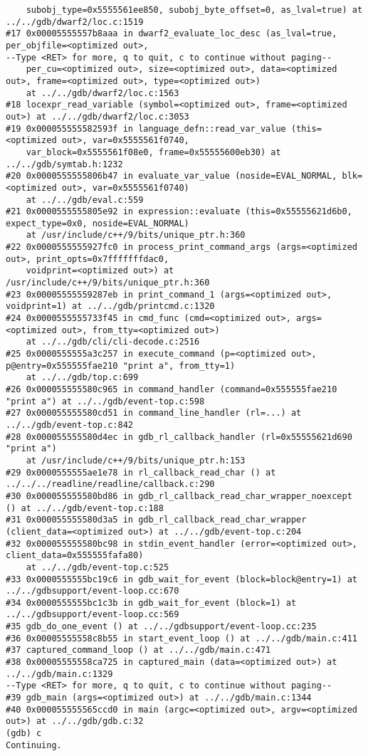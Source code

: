 \documentclass{report}
\begin{document}
\begin{verbatim}
    subobj_type=0x5555561ee850, subobj_byte_offset=0, as_lval=true) at ../../gdb/dwarf2/loc.c:1519
#17 0x00005555557b8aaa in dwarf2_evaluate_loc_desc (as_lval=true, per_objfile=<optimized out>, 
--Type <RET> for more, q to quit, c to continue without paging--
    per_cu=<optimized out>, size=<optimized out>, data=<optimized out>, frame=<optimized out>, type=<optimized out>)
    at ../../gdb/dwarf2/loc.c:1563
#18 locexpr_read_variable (symbol=<optimized out>, frame=<optimized out>) at ../../gdb/dwarf2/loc.c:3053
#19 0x000055555582593f in language_defn::read_var_value (this=<optimized out>, var=0x5555561f0740, 
    var_block=0x5555561f08e0, frame=0x55555600eb30) at ../../gdb/symtab.h:1232
#20 0x0000555555806b47 in evaluate_var_value (noside=EVAL_NORMAL, blk=<optimized out>, var=0x5555561f0740)
    at ../../gdb/eval.c:559
#21 0x0000555555805e92 in expression::evaluate (this=0x55555621d6b0, expect_type=0x0, noside=EVAL_NORMAL)
    at /usr/include/c++/9/bits/unique_ptr.h:360
#22 0x0000555555927fc0 in process_print_command_args (args=<optimized out>, print_opts=0x7fffffffdac0, 
    voidprint=<optimized out>) at /usr/include/c++/9/bits/unique_ptr.h:360
#23 0x00005555559287eb in print_command_1 (args=<optimized out>, voidprint=1) at ../../gdb/printcmd.c:1320
#24 0x0000555555733f45 in cmd_func (cmd=<optimized out>, args=<optimized out>, from_tty=<optimized out>)
    at ../../gdb/cli/cli-decode.c:2516
#25 0x0000555555a3c257 in execute_command (p=<optimized out>, p@entry=0x555555fae210 "print a", from_tty=1)
    at ../../gdb/top.c:699
#26 0x000055555580c965 in command_handler (command=0x555555fae210 "print a") at ../../gdb/event-top.c:598
#27 0x000055555580cd51 in command_line_handler (rl=...) at ../../gdb/event-top.c:842
#28 0x000055555580d4ec in gdb_rl_callback_handler (rl=0x55555621d690 "print a")
    at /usr/include/c++/9/bits/unique_ptr.h:153
#29 0x0000555555ae1e78 in rl_callback_read_char () at ../../../readline/readline/callback.c:290
#30 0x000055555580bd86 in gdb_rl_callback_read_char_wrapper_noexcept () at ../../gdb/event-top.c:188
#31 0x000055555580d3a5 in gdb_rl_callback_read_char_wrapper (client_data=<optimized out>) at ../../gdb/event-top.c:204
#32 0x000055555580bc98 in stdin_event_handler (error=<optimized out>, client_data=0x555555fafa80)
    at ../../gdb/event-top.c:525
#33 0x0000555555bc19c6 in gdb_wait_for_event (block=block@entry=1) at ../../gdbsupport/event-loop.cc:670
#34 0x0000555555bc1c3b in gdb_wait_for_event (block=1) at ../../gdbsupport/event-loop.cc:569
#35 gdb_do_one_event () at ../../gdbsupport/event-loop.cc:235
#36 0x00005555558c8b55 in start_event_loop () at ../../gdb/main.c:411
#37 captured_command_loop () at ../../gdb/main.c:471
#38 0x00005555558ca725 in captured_main (data=<optimized out>) at ../../gdb/main.c:1329
--Type <RET> for more, q to quit, c to continue without paging--
#39 gdb_main (args=<optimized out>) at ../../gdb/main.c:1344
#40 0x000055555565ccd0 in main (argc=<optimized out>, argv=<optimized out>) at ../../gdb/gdb.c:32
(gdb) c
Continuing.


\end{verbatim}
\end{document}
